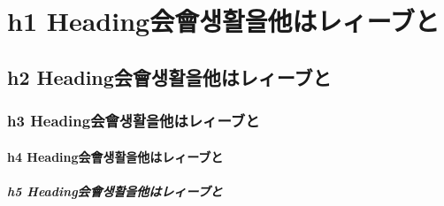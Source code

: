\documentclass[
  paper=a4,
  ,captions=tableheading
]{scrartcl}
\begin{document}




{
\hypersetup{linkcolor=}
\setcounter{tocdepth}{3}
\tableofcontents


\thispagestyle{empty}
\newpage
\setcounter{page}{1}
}

\hypertarget{h1-headingux4f1aux6703uxc0dduxd65cuxc744ux4ed6ux306fux30ecux30a3ux30fcux30d6ux3068}{%
\section{h1
Heading会會생활을他はレィーブと}\label{h1-headingux4f1aux6703uxc0dduxd65cuxc744ux4ed6ux306fux30ecux30a3ux30fcux30d6ux3068}}

\hypertarget{h2-headingux4f1aux6703uxc0dduxd65cuxc744ux4ed6ux306fux30ecux30a3ux30fcux30d6ux3068}{%
\subsection{h2
Heading会會생활을他はレィーブと}\label{h2-headingux4f1aux6703uxc0dduxd65cuxc744ux4ed6ux306fux30ecux30a3ux30fcux30d6ux3068}}

\hypertarget{h3-headingux4f1aux6703uxc0dduxd65cuxc744ux4ed6ux306fux30ecux30a3ux30fcux30d6ux3068}{%
\subsubsection{h3
Heading会會생활을他はレィーブと}\label{h3-headingux4f1aux6703uxc0dduxd65cuxc744ux4ed6ux306fux30ecux30a3ux30fcux30d6ux3068}}

\hypertarget{h4-headingux4f1aux6703uxc0dduxd65cuxc744ux4ed6ux306fux30ecux30a3ux30fcux30d6ux3068}{%
\paragraph{h4
Heading会會생활을他はレィーブと}\label{h4-headingux4f1aux6703uxc0dduxd65cuxc744ux4ed6ux306fux30ecux30a3ux30fcux30d6ux3068}}

\hypertarget{h5-headingux4f1aux6703uxc0dduxd65cuxc744ux4ed6ux306fux30ecux30a3ux30fcux30d6ux3068}{%
\subparagraph{h5
Heading会會생활을他はレィーブと}\label{h5-headingux4f1aux6703uxc0dduxd65cuxc744ux4ed6ux306fux30ecux30a3ux30fcux30d6ux3068}}
\end{document}
